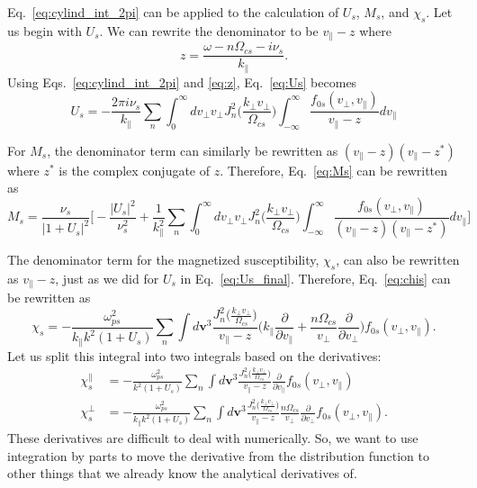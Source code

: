 Eq.~\ref{eq:cylind_int_2pi} can be applied to the calculation of $U_s$, $M_s$, and $\chi_s$. 
Let us begin with $U_s$. We can rewrite the denominator to be $v_\parallel-z$ where 
\begin{equation}
	z = \frac{\omega - n\Omega_{cs}- i \nu_s}{k_\parallel}.
	\label{eq:z}
\end{equation}
Using Eqs.~\ref{eq:cylind_int_2pi} and \ref{eq:z}, Eq.~\ref{eq:Us} becomes
\begin{equation}
	U_s = - \frac{2 \pi i \nu_s}{k_\parallel} \sum_n 
	\int_0^\infty dv_\perp v_\perp J_n^2 \bigg( \frac{k_\perp v_\perp}{\Omega_{cs}} \bigg)
	\int_{-\infty}^\infty  
	\frac{f_{0s}(v_\perp, v_\parallel)}{v_\parallel - z} dv_\parallel
	\label{eq:Us_final}
\end{equation}


For $M_s$, the denominator term can similarly be rewritten as $(v_\parallel-z)(v_\parallel-z^*)$
where $z^*$ is the complex conjugate of $z$.
Therefore, Eq.~\ref{eq:Ms} can be rewritten as  %
\begin{equation}
	M_s = \frac{\nu_s}{|1+U_s|^2} 
	\Bigg[ -\frac{|U_s|^2}{\nu_s^2} 
	+ \frac{1}{k_\parallel^2}\sum_n \int_0^\infty   dv_\perp v_\perp J_n^2 \bigg( \frac{k_\perp v_\perp}{\Omega_{cs}} \bigg)
	\int_{-\infty}^\infty \frac{f_{0s}(v_\perp, v_\parallel)}{(v_\parallel - z)(v_\parallel - z^*)} dv_\parallel
	\Bigg]
	\label{eq:Ms_final}
\end{equation}


The denominator term for the magnetized susceptibility, $\chi_s$, can also be rewritten as $v_\parallel-z$, just as we did for $U_s$ in Eq.~\ref{eq:Us_final}.
Therefore, Eq.~\ref{eq:chis} can be rewritten as
\begin{equation}
	\chi_s = -\frac{\omega_{ps}^2}{k_\parallel k^2 (1+U_s)} \sum_n \int d\mathbf{v}^3 
	 \frac{ J_n^2\Big( \frac{k_\perp v_\perp}{\Omega_{cs}}\Big)  }{v_\parallel-z}
	\bigg( k_\parallel \frac{\partial}{\partial v_\parallel} + \frac{n\Omega_{cs}}{v_\perp} \frac{\partial }{\partial v_\perp}  \bigg) f_{0s}(v_\perp, v_\parallel) .
	\label{eq:chis_denom}
\end{equation}
Let us split this integral into two integrals based on the derivatives:
\begin{align}
	\chi_s^\parallel &= -\frac{\omega_{ps}^2}{k^2 (1+U_s)} \sum_n \int d\mathbf{v}^3 
	\frac{ J_n^2\Big( \frac{k_\perp v_\perp}{\Omega_{cs}}\Big)  }{v_\parallel-z}
	\frac{\partial}{\partial v_\parallel} f_{0s}(v_\perp, v_\parallel)
	\label{eq:chis_par} \\
	\chi_s^\perp &= -\frac{\omega_{ps}^2}{k_\parallel k^2 (1+U_s)} \sum_n \int d\mathbf{v}^3 
	\frac{ J_n^2\Big( \frac{k_\perp v_\perp}{\Omega_{cs}}\Big)  }{v_\parallel-z}
	\frac{n\Omega_{cs}}{v_\perp} \frac{\partial }{\partial v_\perp} f_{0s}(v_\perp, v_\parallel).
	\label{eq:chis_perp}
\end{align}
These derivatives are difficult to deal with numerically.
So, we want to use integration by parts to move the derivative from the distribution function to other things that we already know the analytical derivatives of.

